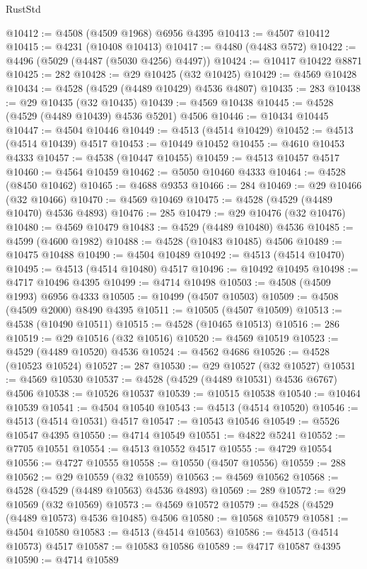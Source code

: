 \begin{lexlean}{RustStd}
\begin{coremodule}
@10412 := @4508 (@4509 @1968) @6956 @4395
@10413 := @4507 @10412
@10415 := @4231 (@10408 @10413)
@10417 := @4480 (@4483 @572)
@10422 := @4496 (@5029 (@4487 (@5030 @4256) @4497))
@10424 := @10417 @10422 @8871
@10425 := 282
@10428 := @29 @10425 (@32 @10425)
@10429 := @4569 @10428
@10434 := @4528 (@4529 (@4489 @10429) @4536 @4807)
@10435 := 283
@10438 := @29 @10435 (@32 @10435)
@10439 := @4569 @10438
@10445 := @4528 (@4529 (@4489 @10439) @4536 @5201) @4506
@10446 := @10434 @10445
@10447 := @4504 @10446
@10449 := @4513 (@4514 @10429)
@10452 := @4513 (@4514 @10439) @4517
@10453 := @10449 @10452
@10455 := @4610 @10453 @4333
@10457 := @4538 (@10447 @10455)
@10459 := @4513 @10457 @4517
@10460 := @4564 @10459
@10462 := @5050 @10460 @4333
@10464 := @4528 (@8450 @10462)
@10465 := @4688 @9353
@10466 := 284
@10469 := @29 @10466 (@32 @10466)
@10470 := @4569 @10469
@10475 := @4528 (@4529 (@4489 @10470) @4536 @4893)
@10476 := 285
@10479 := @29 @10476 (@32 @10476)
@10480 := @4569 @10479
@10483 := @4529 (@4489 @10480) @4536
@10485 := @4599 (@4600 @1982)
@10488 := @4528 (@10483 @10485) @4506
@10489 := @10475 @10488
@10490 := @4504 @10489
@10492 := @4513 (@4514 @10470)
@10495 := @4513 (@4514 @10480) @4517
@10496 := @10492 @10495
@10498 := @4717 @10496 @4395
@10499 := @4714 @10498
@10503 := @4508 (@4509 @1993) @6956 @4333
@10505 := @10499 (@4507 @10503)
@10509 := @4508 (@4509 @2000) @8490 @4395
@10511 := @10505 (@4507 @10509)
@10513 := @4538 (@10490 @10511)
@10515 := @4528 (@10465 @10513)
@10516 := 286
@10519 := @29 @10516 (@32 @10516)
@10520 := @4569 @10519
@10523 := @4529 (@4489 @10520) @4536
@10524 := @4562 @4686
@10526 := @4528 (@10523 @10524)
@10527 := 287
@10530 := @29 @10527 (@32 @10527)
@10531 := @4569 @10530
@10537 := @4528 (@4529 (@4489 @10531) @4536 @6767) @4506
@10538 := @10526 @10537
@10539 := @10515 @10538
@10540 := @10464 @10539
@10541 := @4504 @10540
@10543 := @4513 (@4514 @10520)
@10546 := @4513 (@4514 @10531) @4517
@10547 := @10543 @10546
@10549 := @5526 @10547 @4395
@10550 := @4714 @10549
@10551 := @4822 @5241
@10552 := @7705 @10551
@10554 := @4513 @10552 @4517
@10555 := @4729 @10554
@10556 := @4727 @10555
@10558 := @10550 (@4507 @10556)
@10559 := 288
@10562 := @29 @10559 (@32 @10559)
@10563 := @4569 @10562
@10568 := @4528 (@4529 (@4489 @10563) @4536 @4893)
@10569 := 289
@10572 := @29 @10569 (@32 @10569)
@10573 := @4569 @10572
@10579 := @4528 (@4529 (@4489 @10573) @4536 @10485) @4506
@10580 := @10568 @10579
@10581 := @4504 @10580
@10583 := @4513 (@4514 @10563)
@10586 := @4513 (@4514 @10573) @4517
@10587 := @10583 @10586
@10589 := @4717 @10587 @4395
@10590 := @4714 @10589

\end{coremodule}
\end{lexlean}
